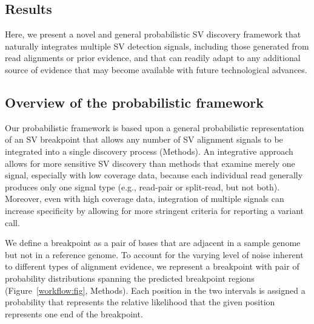 \documentclass[10pt]{bmc_article}
\newenvironment{bmcformat}{\begin{raggedright}\baselineskip20pt\sloppy\setboolean{publ}{false}}{\end{raggedright}\baselineskip20pt\sloppy}
\begin{document}
\begin{bmcformat}
\section*{Results}
Here, we present a novel and general probabilistic SV discovery framework that
naturally integrates multiple SV detection signals, including those generated
from read alignments or prior evidence, and that can readily adapt to any
additional source of evidence that may become available with future
technological advances.

\subsection*{Overview of the probabilistic framework}

Our probabilistic framework is based upon a general probabilistic representation
of an SV breakpoint that allows any number of SV alignment signals to be
integrated into a single discovery process (Methods). An integrative approach
allows for more sensitive SV discovery than methods that examine merely one
signal, especially with low coverage data, because each individual read
generally produces only one signal type (e.g., read-pair or split-read, but not
both). Moreover, even with high coverage data, integration of multiple signals
can increase specificity by allowing for more stringent criteria for reporting a
variant call.

We define a breakpoint as a pair of bases that are adjacent in a sample genome
but not in a reference genome. To account for the varying level of noise
inherent to different types of alignment evidence, we represent a breakpoint
with pair of probability distributions spanning the predicted breakpoint regions
(Figure~\ref{workflow:fig}, Methods). Each position in the two intervals is
assigned a probability that represents the relative likelihood that the given
position represents one end of the breakpoint.


\end{bmcformat}
\end{document}
